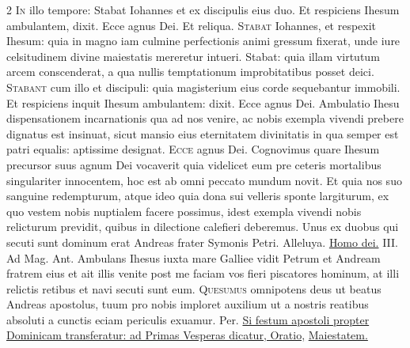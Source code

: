 \begin{multicols*}{2}
{\color{Red} }
\lettrine[lines=2]{\zallmancaps \color{Blue} I}{n} illo tempore: Stabat Iohannes et ex discipulis eius duo. Et respiciens Ihesum ambulantem, dixit. Ecce agnus Dei. Et reliqua.
 \grecross
\lettrine[lines=2]{\zallmancaps \color{Red} S}{tabat} Iohannes, et respexit Ihesum: quia in magno iam culmine perfectionis animi gressum fixerat, unde iure celsitudinem divine maiestatis mereretur intueri. Stabat: quia illam virtutum arcem conscenderat, a qua nullis temptationum improbitatibus posset deici.
\lettrine[lines=2]{\zallmancaps \color{Blue} S}{tabant} cum illo et discipuli: quia magisterium eius corde sequebantur immobili. Et respiciens inquit Ihesum ambulantem: dixit. Ecce agnus Dei. Ambulatio Ihesu dispensationem incarnationis qua ad nos venire, ac nobis exempla vivendi prebere dignatus est insinuat, sicut mansio eius eternitatem divinitatis in qua semper est patri equalis: aptissime designat.
\lettrine[lines=2]{\zallmancaps \color{Red} E}{cce} agnus Dei. Cognovimus quare Ihesum precursor suus agnum Dei vocaverit quia videlicet eum pre ceteris mortalibus singulariter innocentem, hoc est ab omni peccato mundum novit. Et quia nos suo sanguine redempturum, atque ideo quia dona sui velleris sponte largiturum, ex quo vestem nobis nuptialem facere possimus, idest exempla vivendi nobis relicturum previdit, quibus in dilectione calefieri deberemus.
 Unus ex duobus qui secuti sunt dominum erat Andreas frater Symonis Petri. Alleluya. \R \hyperlink{homo-dei-ducebatur}{Homo dei.} {\color{Red} III. Ad Mag. Ant.} Ambulans Ihesus iuxta mare Galliee vidit Petrum et Andream fratrem eius et ait illis venite post me faciam vos fieri piscatores hominum, at illi relictis retibus et navi secuti sunt eum.
\lettrine[lines=2]{\zallmancaps \color{Blue} Q}{uesumus} omnipotens deus ut beatus Andreas apostolus, tuum pro nobis imploret auxilium ut a nostris reatibus absoluti a cunctis eciam periculis exuamur. Per.
\newline \ul{Si festum apostoli propter Dominicam transferatur: ad Primas Vesperas dicatur, Oratio,} \hyperlink{maiestatem-andree}{Maiestatem.}

\end{multicols*}
